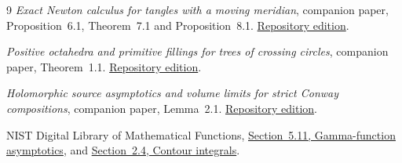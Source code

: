 \begin{thebibliography}{9}
\emph{Exact Newton calculus for tangles with a moving meridian},
companion paper, Proposition~6.1, Theorem~7.1 and Proposition~8.1.
\href{https://sashakolpakov.github.io/murakamis_dream/papers/meridian-tangles.pdf}
{Repository edition}.

\emph{Positive octahedra and primitive fillings for trees of crossing circles},
companion paper, Theorem~1.1.
\href{https://sashakolpakov.github.io/murakamis_dream/papers/circle-tree-geometry.pdf}
{Repository edition}.

\emph{Holomorphic source asymptotics and volume limits for strict Conway compositions},
companion paper, Lemma~2.1.
\href{https://sashakolpakov.github.io/murakamis_dream/papers/conway-asymptotics.pdf}
{Repository edition}.

NIST Digital Library of Mathematical Functions,
\href{https://dlmf.nist.gov/5.11}{Section~5.11, Gamma-function asymptotics},
and \href{https://dlmf.nist.gov/2.4}{Section~2.4, Contour integrals}.
\end{thebibliography}

